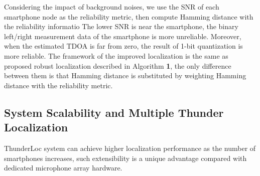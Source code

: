  


Considering the impact of background noises, we use the SNR of each smartphone node as the reliability metric, then compute Hamming distance with the reliability informatio
The lower SNR is near the smartphone, the binary left/right measurement data of the smartphone is more unreliable.   
Moreover, when the estimated TDOA is far from zero, the result of 1-bit quantization is more reliable. 
The framework of the improved localization is the same as proposed robust localization described in Algorithm \textbf{1}, 
the only difference between them is that Hamming distance is substituted by weighting Hamming distance with the reliability metric.

 \vspace{-2mm}   
\subsection{System Scalability and Multiple Thunder Localization}

ThunderLoc system can achieve higher localization performance as the number of smartphones increases,
such extensibility is a unique advantage compared with dedicated microphone array hardware.

